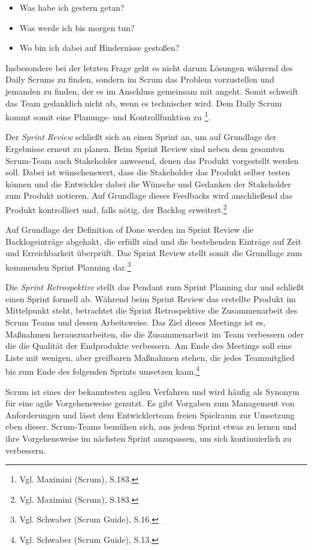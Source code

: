             \begin{itemize}
                \item Was habe ich gestern getan?
                \item Was werde ich bis morgen tun?
                \item Wo bin ich dabei auf Hindernisse gestoßen?
            \end{itemize}

            Insbesondere bei der letzten Frage geht es nicht darum Lösungen während des Daily Scrums zu finden, sondern im Scrum das Problem vorzustellen und jemanden zu finden, der es im Anschluss gemeinsam mit angeht. Somit schweift das Team gedanklich nicht ab, wenn es technischer wird. Dem Daily Scrum kommt somit eine Planungs- und Kontrollfunktion zu \footnote{Vgl. Maximini (Scrum), S.183.}.

            Der \emph{Sprint Review} schließt sich an einen Sprint an, um auf Grundlage der Ergebnisse erneut zu planen. Beim Sprint Review sind neben dem gesamten Scrum-Team auch Stakeholder anwesend, denen das Produkt vorgestellt werden soll. Dabei ist wünschenswert, dass die Stakeholder das Produkt selber testen können und die Entwickler dabei die Wünsche und Gedanken der Stakeholder zum Produkt notieren. Auf Grundlage dieses Feedbacks wird anschließend das Produkt kontrolliert und, falls nötig, der Backlog erweitert.\footnote{Vgl. Maximini (Scrum), S.183.}

            Auf Grundlage der Definition of Done werden im Sprint Review die Backlogeinträge abgehakt, die erfüllt sind und die bestehenden Einträge auf Zeit und Erreichbarkeit überprüft. Das Sprint Review stellt somit die Grundlage zum kommenden Sprint Planning dar.\footnote{Vgl. Schwaber (Scrum Guide), S.16.}

            Die \emph{Sprint Retrospektive} stellt das Pendant zum Sprint Planning dar und schließt einen Sprint formell ab. Während beim Sprint Review das erstellte Produkt im Mittelpunkt steht, betrachtet die Sprint Retrospektive die Zusammenarbeit des Scrum Teams und dessen Arbeitsweise. Das Ziel dieses Meetings ist es, Maßnahmen herauszuarbeiten, die die Zusammenarbeit im Team verbessern oder die die Qualität der Endprodukte verbessern. Am Ende des Meetings soll eine Liste mit wenigen, aber greifbaren Maßnahmen stehen, die jedes Teammitglied bis zum Ende des folgenden Sprints umsetzen kann.\footnote{Vgl. Schwaber (Scrum Guide), S.13.}

            Scrum ist eines der bekanntesten agilen Verfahren und wird häufig als Synonym für eine agile Vorgehensweise genutzt. Es gibt Vorgaben zum Management von Anforderungen und lässt dem Entwicklerteam freien Spielraum zur Umsetzung eben dieser. Scrum-Teams bemühen sich, aus jedem Sprint etwas zu lernen und ihre Vorgehensweise im nächsten Sprint anzupassen, um sich kontinuierlich zu verbessern. 
